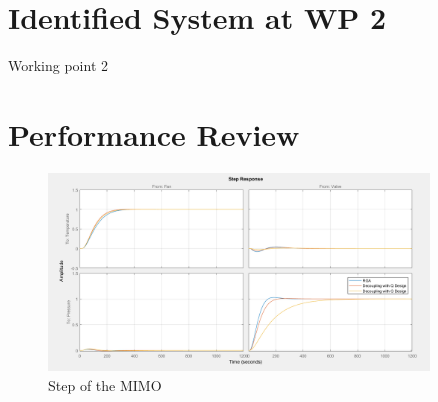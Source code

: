 \section{Identified System at WP 2}%
\label{c:fotd:s:wp1}

Working point 2

\section{Performance Review} %
\label{c:fotd:s:performance_review}

\begin{figure}[H]
\begin{minipage}[b]{\textwidth}
\centering
\includegraphics[width=0.9\textwidth]{./Graphics/Step_MATLAB.png}
\caption{Step of the MIMO}
\label{c:fotd:f:mimo_step}
\end{minipage}
\end{figure}


